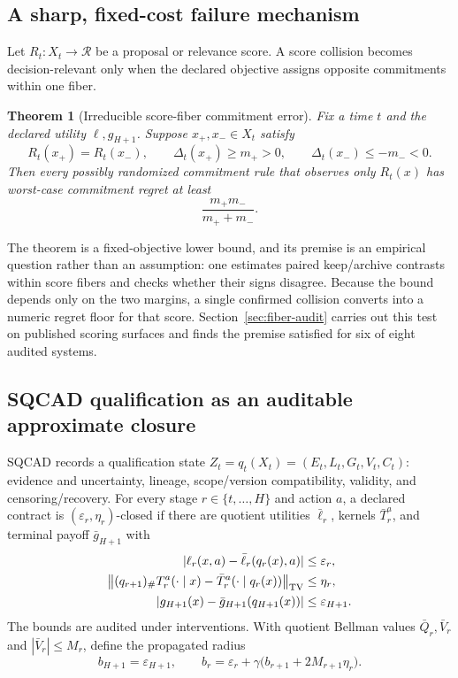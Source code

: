 \documentclass{article}
\newtheorem{theorem}{Theorem}
\begin{document}
\subsection{A sharp, fixed-cost failure mechanism}
Let $R_t:X_t\to\mathcal R$ be a proposal or relevance score. A score collision
becomes decision-relevant only when the declared objective assigns opposite
commitments within one fiber.
\begin{theorem}[Irreducible score-fiber commitment error]
\label{thm:score-fiber}
Fix a time $t$ and the declared utility $\ell,g_{H+1}$. Suppose $x_+,x_-\in X_t$ satisfy
\begin{equation}
R_t(x_+)=R_t(x_-),\qquad \Delta_t(x_+)\ge m_+>0,\qquad \Delta_t(x_-)\le-m_-<0.
\label{eq:opposite-fiber}
\end{equation}
Then every possibly randomized commitment rule that observes only $R_t(x)$ has worst-case commitment regret at least
\begin{equation}
\frac{m_+m_-}{m_++m_-}.
\label{eq:fiber-lower-bound}
\end{equation}
\end{theorem}
The theorem is a fixed-objective lower bound, and its premise is an empirical
question rather than an assumption: one estimates paired keep/archive contrasts
within score fibers and checks whether their signs disagree. Because the bound
depends only on the two margins, a single confirmed collision converts into a
numeric regret floor for that score. Section~\ref{sec:fiber-audit} carries out
this test on published scoring surfaces and finds the premise satisfied for six
of eight audited systems.

\subsection{SQCAD qualification as an auditable approximate closure}
SQCAD records a qualification state $Z_t=q_t(X_t)=(E_t,L_t,G_t,V_t,C_t)$: evidence
and uncertainty, lineage, scope/version compatibility, validity, and
censoring/recovery. For every stage $r\in\{t,\ldots,H\}$ and action $a$, a declared
contract is $(\varepsilon_r,\eta_r)$-closed if there are quotient utilities
$\bar\ell_r$, kernels $\bar T_r^a$, and terminal payoff $\bar g_{H+1}$ with
\begin{align}
|\ell_r(x,a)-\bar\ell_r(q_r(x),a)|&\le\varepsilon_r, \\
\left\|(q_{r+1})_\#T_r^a(\cdot\mid x)-\bar T_r^a(\cdot\mid q_r(x))\right\|_{\rm TV}&\le\eta_r, \\
|g_{H+1}(x)-\bar g_{H+1}(q_{H+1}(x))|&\le\varepsilon_{H+1}.
\label{eq:closure}
\end{align}
The bounds are audited under interventions. With quotient Bellman values
$\bar Q_r,\bar V_r$ and $|\bar V_r|\le M_r$, define the propagated radius
\begin{equation}
b_{H+1}=\varepsilon_{H+1},\qquad
b_r=\varepsilon_r+\gamma\bigl(b_{r+1}+2M_{r+1}\eta_r\bigr).
\label{eq:radius}
\end{equation}
\end{document}
